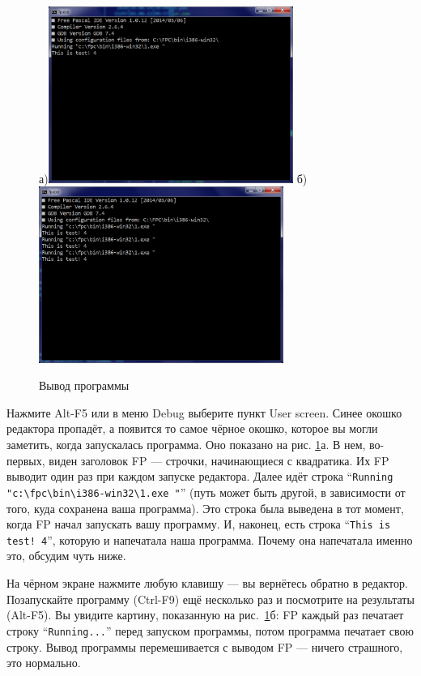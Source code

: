 \begin{figure}
\centerline{
а)\includegraphics[width=8cm]{output-1.png}
б)\includegraphics[width=8cm]{output-3.png}
}
\caption{Вывод программы}
\label{output}
\end{figure}

Нажмите Alt-F5 или в меню Debug выберите пункт User screen. Синее окошко редактора пропадёт, а появится
то самое чёрное окошко, которое вы могли заметить, когда запускалась программа. Оно показано на рис. \ref{output}а. В нем,
во-первых, виден заголовок FP — строчки, начинающиеся с квадратика. Их FP выводит один раз при каждом запуске
редактора. Далее идёт строка ``\verb`Running "c:\fpc\bin\i386-win32\1.exe "`'' (путь может быть другой, в зависимости от того, куда сохранена ваша программа). Это строка была выведена в тот момент, когда FP начал запускать
вашу программу. И, наконец, есть строка ``\verb`This is test! 4`'', которую и напечатала наша программа. Почему она
напечатала именно это, обсудим чуть ниже.

На чёрном экране нажмите любую клавишу — вы вернётесь обратно в редактор. Позапускайте программу (Ctrl-F9)
ещё несколько раз и посмотрите на результаты (Alt-F5). Вы увидите картину, показанную на рис.~\ref{output}б: FP каждый раз
печатает строку ``\verb`Running...`'' перед запуском программы, потом программа печатает свою строку.
Вывод программы перемешивается с выводом FP — ничего страшного, это нормально.


